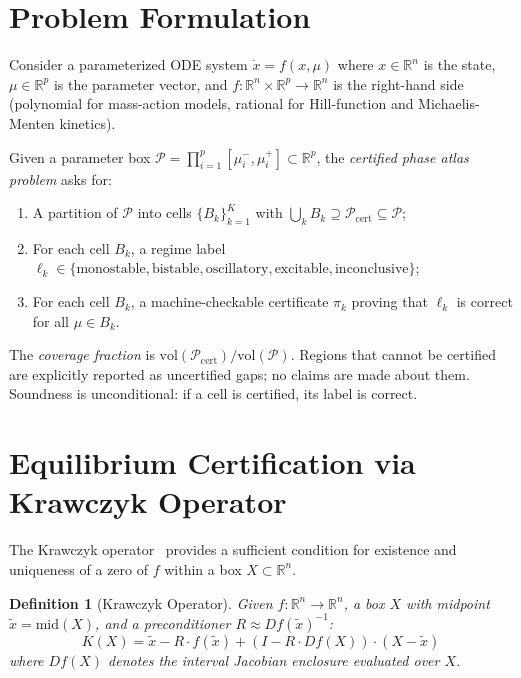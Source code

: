 \documentclass[11pt]{article}
\newtheorem{definition}[theorem]{Definition}
\newcommand{\R}{\mathbb{R}}
\begin{document}
\section{Problem Formulation}
\label{sec:problem}

Consider a parameterized ODE system $\dot{x} = f(x, \mu)$ where $x \in \R^n$ is the state, $\mu \in \R^p$ is the parameter vector, and $f: \R^n \times \R^p \to \R^n$ is the right-hand side (polynomial for mass-action models, rational for Hill-function and Michaelis-Menten kinetics).

Given a parameter box $\mathcal{P} = \prod_{i=1}^p [\mu_i^-, \mu_i^+] \subset \R^p$, the \emph{certified phase atlas problem} asks for:
\begin{enumerate}
\item A partition of $\mathcal{P}$ into cells $\{B_k\}_{k=1}^K$ with $\bigcup_k B_k \supseteq \mathcal{P}_{\mathrm{cert}} \subseteq \mathcal{P}$;
\item For each cell $B_k$, a regime label $\ell_k \in \{\text{monostable}, \text{bistable}, \text{oscillatory}, \text{excitable}, \text{inconclusive}\}$;
\item For each cell $B_k$, a machine-checkable certificate $\pi_k$ proving that $\ell_k$ is correct for all $\mu \in B_k$.
\end{enumerate}

The \emph{coverage fraction} is $\mathrm{vol}(\mathcal{P}_{\mathrm{cert}}) / \mathrm{vol}(\mathcal{P})$.
Regions that cannot be certified are explicitly reported as uncertified gaps; no claims are made about them.
Soundness is unconditional: if a cell is certified, its label is correct.

\section{Equilibrium Certification via Krawczyk Operator}
\label{sec:krawczyk}

The Krawczyk operator~\cite{krawczyk1969newton} provides a sufficient condition for existence and uniqueness of a zero of $f$ within a box $X \subset \R^n$.

\begin{definition}[Krawczyk Operator]
\label{def:krawczyk}
Given $f: \R^n \to \R^n$, a box $X$ with midpoint $\tilde{x} = \mathrm{mid}(X)$, and a preconditioner $R \approx Df(\tilde{x})^{-1}$:
\[
K(X) = \tilde{x} - R \cdot f(\tilde{x}) + (I - R \cdot Df(X)) \cdot (X - \tilde{x})
\]
where $Df(X)$ denotes the interval Jacobian enclosure evaluated over $X$.
\end{definition}
\end{document}
